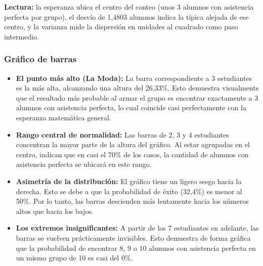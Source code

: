 \medskip
\noindent\textbf{Lectura:} la esperanza ubica el centro del conteo (unos 3 alumnos con asistencia perfecta por grupo), el desvío de 1,4803 alumnos indica la típica alejada de ese centro, y la varianza mide la dispersión en unidades al cuadrado como paso intermedio.

\subsubsection{Gráfico de barras}


\begin{itemize}
  \item \textbf{El punto más alto (La Moda):}
    La barra correspondiente a 3 estudiantes es la más alta, alcanzando una altura del 26,33\%. Esto
    demuestra visualmente que el resultado más probable al armar el grupo es encontrar exactamente a
    3 alumnos con asistencia perfecta, lo cual coincide casi perfectamente con la esperanza
    matemática general.

  \item \textbf{Rango central de normalidad:}
    Las barras de 2, 3 y 4 estudiantes concentran la mayor parte de la altura del gráfico. Al estar
    agrupadas en el centro, indican que en casi el 70\% de los casos, la cantidad de alumnos con
    asistencia perfecta se ubicará en este rango.

  \item \textbf{Asimetría de la distribución:}
    El gráfico tiene un ligero sesgo hacia la derecha. Esto se debe a que la probabilidad de éxito
    (32,4\%) es menor al 50\%. Por lo tanto, las barras descienden más lentamente hacia los números
    altos que hacia los bajos.

  \item \textbf{Los extremos insignificantes:}
    A partir de los 7 estudiantes en adelante, las barras se vuelven prácticamente invisibles. Esto
    demuestra de forma gráfica que la probabilidad de encontrar 8, 9 o 10 alumnos con asistencia
    perfecta en un mismo grupo de 10 es casi del 0\%.
\end{itemize}